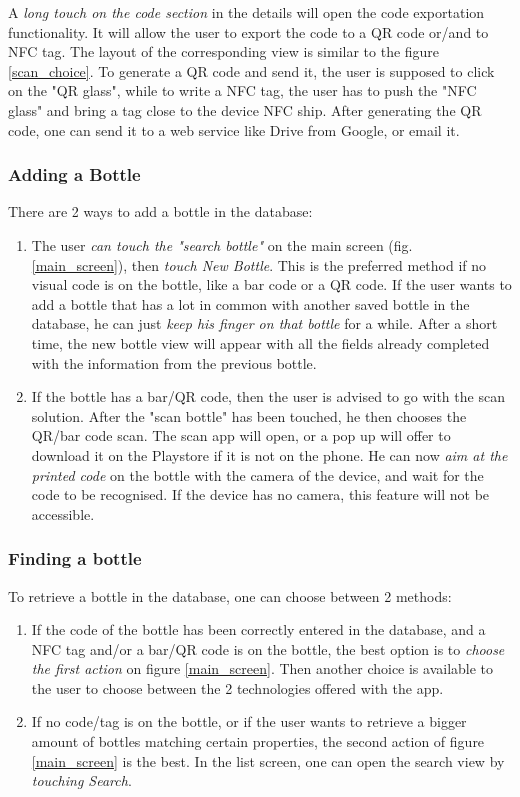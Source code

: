 A \emph{long touch on the code section} in the details will open the code exportation functionality. It will allow the user to export the code to a QR code or/and to NFC tag. The layout of the corresponding view is similar to the figure \ref{scan_choice}. To generate a QR code and send it, the user is supposed to click on the "QR glass", while to write a NFC tag, the user has to push the "NFC glass" and bring a tag close to the device NFC ship. After generating the QR code, one can send it to a web service like Drive from Google, or email it.

\subsubsection{Adding a Bottle}

There are 2 ways to add a bottle in the database:

\begin{enumerate}
\item The user \emph{can touch the "search bottle"} on the main screen (fig. \ref{main_screen}), then \emph{touch New Bottle}. This is the preferred method if no visual code is on the bottle, like a bar code or a QR code. If the user wants to add a bottle that has a lot in common with another saved bottle in the database, he can just \emph{keep his finger on that bottle} for a while. After a short time, the new bottle view will appear with all the fields already completed with the information from the previous bottle.

\item If the bottle has a bar/QR code, then the user is advised to go with the scan solution. After the "scan bottle" has been touched, he then chooses the QR/bar code scan. The scan app will open, or a pop up will offer to download it on the Playstore if it is not on the phone. He can now \emph{aim at the printed code} on the bottle with the camera of the device, and wait for the code to be recognised. If the device has no camera, this feature will not be accessible.
\end{enumerate}

\subsubsection{Finding a bottle}

To retrieve a bottle in the database, one can choose between 2 methods:

\begin{enumerate}
\item If the code of the bottle has been correctly entered in the database, and a NFC tag and/or a bar/QR code is on the bottle, the best option is to \emph{choose the first action} on figure \ref{main_screen}. Then another choice is available to the user to choose between the 2 technologies offered with the app.

\item If no code/tag is on the bottle, or if the user wants to retrieve a bigger amount of bottles matching certain properties, the second action of figure \ref{main_screen} is the best. In the list screen, one can open the search view by \emph{touching Search}.
\end{enumerate}

